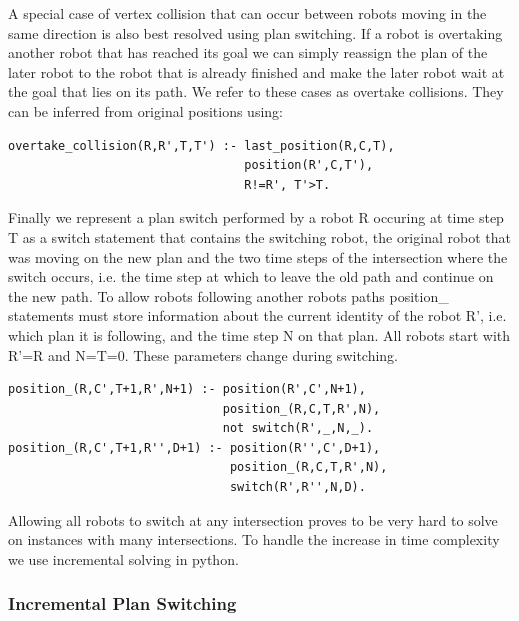 \documentclass{llncs}
\begin{document}
A special case of vertex collision that can occur between robots moving in the same direction is also best resolved using plan switching.
If a robot is overtaking another robot that has reached its goal we can simply reassign the plan of the later robot to the robot that is already finished and make the later robot wait at the goal that lies on its path.
We refer to these cases as overtake collisions. They can be inferred from original positions using:
\begin{verbatim}
overtake_collision(R,R',T,T') :- last_position(R,C,T),
                                 position(R',C,T'), 
                                 R!=R', T'>T.
\end{verbatim}
Finally we represent a plan switch performed by a robot R occuring at time step T as a switch statement that contains the switching robot, the original robot that was moving on the new plan and the two time steps of the intersection where the switch occurs, i.e. the time step at which to leave the old path and continue on the new path. To allow robots following another robots paths position\_ statements must store information about the current identity of the robot R', i.e. which plan it is following, and the time step N on that plan. All robots start with R'=R and N=T=0. These parameters change during switching.
\begin{verbatim}
position_(R,C',T+1,R',N+1) :- position(R',C',N+1), 
                              position_(R,C,T,R',N), 
                              not switch(R',_,N,_).
position_(R,C',T+1,R'',D+1) :- position(R'',C',D+1),                   
                               position_(R,C,T,R',N),
                               switch(R',R'',N,D).
\end{verbatim}

Allowing all robots to switch at any intersection proves to be very hard to solve on instances with many intersections. To handle the increase in time complexity we use incremental solving in python.

\subsubsection{Incremental Plan Switching}
\end{document}
